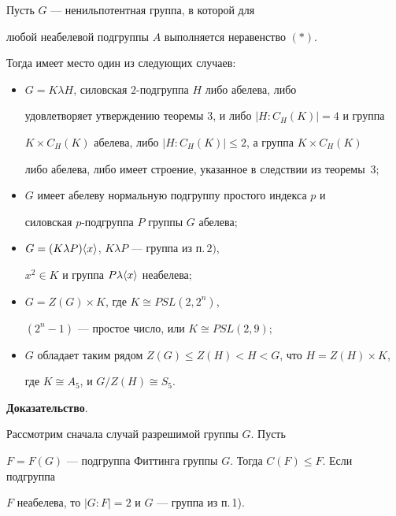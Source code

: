 \begin{thm}


Пусть $G$ --- ненильпотентная группа, в которой для


любой неабелевой подгруппы $A$ выполняется неравенство $(\ast)$.


Тогда имеет место один из следующих случаев\/${:}$


\begin{itemize}


\item[1)] $G=K\lambda H$, силовская $2$-подгруппа $H$ либо абелева, либо


удовлетворяет утверждению теоремы $3$, и либо $|H:C_H(K)|=4$ и группа


$K\times C_H(K)$ абелева, либо $|H:C_H(K)|{\le}2$, а группа $K\times C_H(K)$


либо абелева, либо имеет строение, указанное в следствии из теоремы~$3;$


\item[2)] $G$ имеет абелеву нормальную подгруппу простого индекса $p$ и


силовская $p$-подгруппа $P$ группы $G$ абелева\/$;$


\item[3)] $G=(K\lambda P)\langle x\rangle$, $K\lambda P$ --- группа из п.\,$2)$,


$x^2\in K$ и группа $P\lambda\langle x\rangle$ неабелева\/$;$


\item[4)] $G=Z(G)\times K$, где $K\cong PSL(2,2^n)$,


$(2^n-1)$ --- простое число, или $K\cong PSL(2,9);$


\item[5)] $G$ обладает таким рядом $Z(G)\le Z(H)<H<G$, что $H=Z(H)\times K$,


где $K\cong A_5$, и $G/Z(H)\cong S_5$.


\end{itemize}


\end{thm}





{\bf Доказательство}.


Рассмотрим сначала случай разрешимой группы $G$. Пусть


$F=F(G)$ --- подгруппа Фиттинга группы $G$. Тогда $C(F)\le F$. Если подгруппа


$F$ неабелева, то $|G:F|=2$ и $G$ --- группа из п.\,1).





